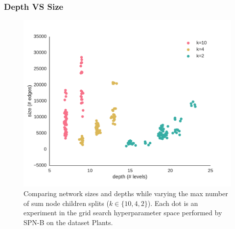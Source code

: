 \documentclass[xcolor={usenames,dvipsnames,svgnames}, compress]{beamer}
\begin{document}
\begin{frame}
  \frametitle{Depth VS Size}

  \begin{figure}[htbp]
    \begin{center}
      \includegraphics[width=0.6\linewidth]{figures/plants-depth.pdf}
      \caption{Comparing network sizes and depths while varying the max
        number of sum node children splits ($k\in\{10, 4, 2\}$). Each dot is an experiment
        in the grid search hyperparameter space performed by
        \textsf{SPN-B} on the dataset Plants.}
    \end{center}
  \end{figure}

\end{frame}
\end{document}
